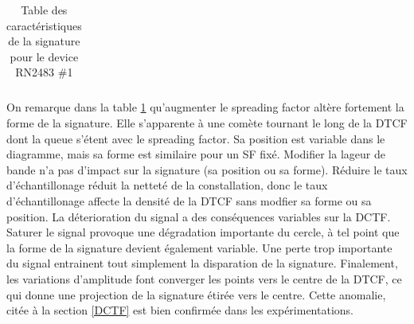 \begin{table}[h]
\begin{tabular}{|c|c|c|c|c|}
\hline
\end{tabular}
\caption{Table des caractéristiques de la signature pour le device RN2483 \#1}
\label{signature1}
\end{table}

On remarque dans la table \ref{signature1} qu'augmenter le spreading factor altère fortement la forme de la signature. Elle s'apparente à une comète tournant le long de la DTCF dont la queue s'étent avec le spreading factor. Sa position est variable dans le diagramme, mais sa forme est similaire pour un SF fixé. Modifier la lageur de bande n'a pas d'impact sur la signature (sa position ou sa forme). Réduire le taux d'échantillonage réduit la netteté de la constallation, donc le taux d'échantillonage affecte la densité de la DTCF sans modfier sa forme ou sa position. La déterioration du signal a des conséquences variables sur la DCTF. Saturer le signal provoque une dégradation importante du cercle, à tel point que la forme de la signature devient également variable. Une perte trop importante du signal entrainent tout simplement la disparation de la signature. Finalement, les variations d'amplitude font converger les points vers le centre de la DTCF, ce qui donne une projection de la signature étirée vers le centre. Cette anomalie, citée à la section \ref{DCTF} est bien confirmée dans les expérimentations.

